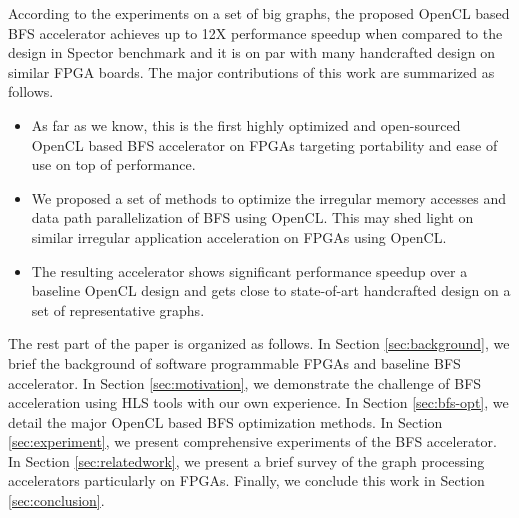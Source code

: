 According to the experiments on a set of big graphs, the proposed OpenCL based BFS 
accelerator achieves up to 12X performance speedup when compared to the design 
in Spector benchmark and it is on par with many handcrafted design on similar FPGA boards. 
The major contributions of this work are summarized as follows.
\begin{itemize}
    \item As far as we know, this is the first highly optimized and open-sourced 
		OpenCL based BFS accelerator on FPGAs targeting portability and ease of 
		use on top of performance. 
    \item We proposed a set of methods to optimize the irregular
		memory accesses and data path parallelization of BFS using OpenCL. 
		This may shed light on similar irregular application acceleration on 
		FPGAs using OpenCL.
    \item The resulting accelerator shows significant performance speedup 
        over a baseline OpenCL design and gets close to state-of-art handcrafted 
		design on a set of representative graphs.
\end{itemize}

The rest part of the paper is organized as follows. In Section \ref{sec:background}, 
we brief the background of software programmable FPGAs and baseline BFS accelerator. 
In Section \ref{sec:motivation},  
we demonstrate the challenge of BFS acceleration using HLS tools with our own experience.
In Section \ref{sec:bfs-opt}, we detail the major OpenCL based BFS optimization methods.
In Section \ref{sec:experiment}, we present comprehensive experiments of the 
BFS accelerator. In Section \ref{sec:relatedwork}, we present a brief survey of 
the graph processing accelerators particularly on FPGAs. Finally, we conclude 
this work in Section \ref{sec:conclusion}.

